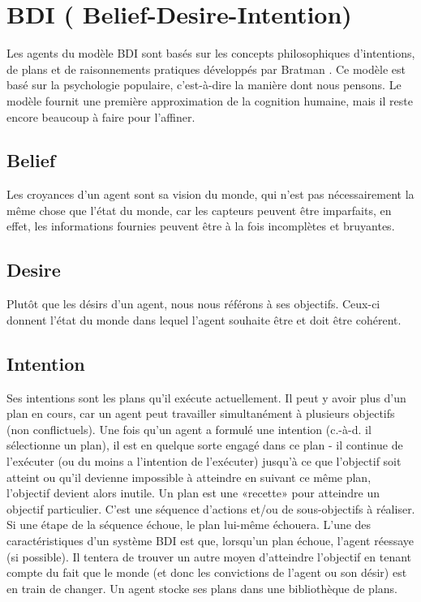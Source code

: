 
\chapter{BDI ( Belief-Desire-Intention)} %

\label{Chapter4} %


Les agents du modèle BDI sont basés sur les concepts philosophiques d'intentions, de plans et de raisonnements pratiques développés par Bratman \parencite{bratman1987intention}. Ce modèle est basé sur la psychologie populaire, c'est-à-dire la manière dont nous pensons. Le modèle fournit une première approximation de la cognition humaine, mais il reste encore beaucoup à faire pour l’affiner.


\section{Belief}

Les croyances d'un agent sont sa vision du monde, qui n'est pas nécessairement la même chose que l'état du monde, car les capteurs peuvent être imparfaits, en effet, les informations fournies peuvent être à la fois incomplètes et bruyantes.

\section{Desire}

Plutôt que les désirs d’un agent, nous nous référons à ses objectifs. Ceux-ci donnent l'état du monde dans lequel l'agent souhaite être et doit être cohérent.


\section{Intention}

Ses intentions sont les plans qu'il exécute actuellement. Il peut y avoir plus d'un plan en cours, car un agent peut travailler simultanément à plusieurs objectifs (non conflictuels). Une fois qu'un agent a formulé une intention (c.-à-d. il sélectionne un plan), il est en quelque sorte engagé dans ce plan - il continue de l'exécuter (ou du moins a l'intention de l'exécuter) jusqu'à ce que l'objectif soit atteint ou qu’il devienne impossible à atteindre en suivant ce même plan, l'objectif devient alors inutile. 
Un plan est une «recette» pour atteindre un objectif particulier. C'est une séquence d'actions et/ou de sous-objectifs à réaliser. Si une étape de la séquence échoue, le plan lui-même échouera. L'une des caractéristiques d'un système BDI est que, lorsqu'un plan échoue, l'agent réessaye (si possible). Il tentera de trouver un autre moyen d’atteindre l’objectif en tenant compte du fait que le monde (et donc les convictions de l’agent ou son désir) est en train de changer. Un agent stocke ses plans dans une bibliothèque de plans.


